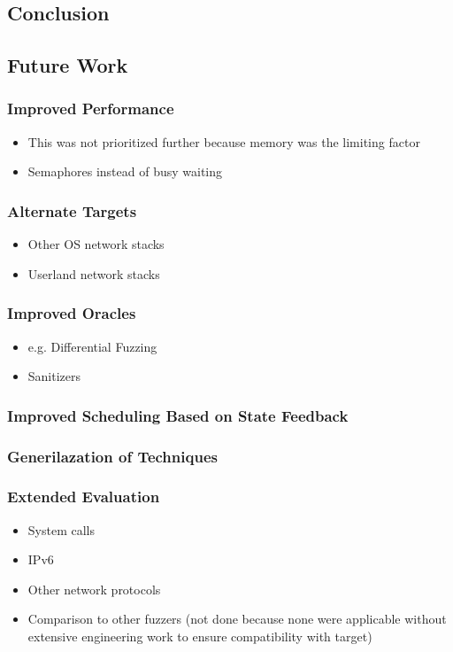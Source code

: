 \documentclass{article}
\begin{document}
\begin{multicols}{2}

  \section{Conclusion}
  \label{Conclusion}
  \subsection{Future Work}
  \subsubsection{Improved Performance}
  \begin{itemize}
    \item This was not prioritized further because memory was the limiting factor
    \item Semaphores instead of busy waiting
  \end{itemize}
  \subsubsection{Alternate Targets}
  \begin{itemize}
    \item Other OS network stacks
    \item Userland network stacks
  \end{itemize}
  \subsubsection{Improved Oracles}
  \begin{itemize}
    \item e.g. Differential Fuzzing
    \item Sanitizers
  \end{itemize}
  \subsubsection{Improved Scheduling Based on State Feedback}
  \subsubsection{Generilazation of Techniques}
  \subsubsection{Extended Evaluation}
  \begin{itemize}
    \item System calls
    \item IPv6
    \item Other network protocols
    \item Comparison to other fuzzers (not done because none were applicable without extensive engineering work to ensure compatibility with target)
  \end{itemize}


\end{multicols}
\end{document}
